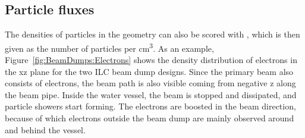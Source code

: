 \subsection{Particle fluxes}
\label{BeamDumps:sim_surrounding:Particle}  
 The densities of particles in the geometry can also be scored with \fluka, which is then given as the number of particles per \si{\centi\meter\cubed}.
 As an example, Figure~\ref{fig:BeamDumps:Electrons} shows the density distribution of electrons in the xz plane for the two ILC beam dump designs.
 Since the primary beam also consists of electrons, the beam path is also visible coming from negative z along the beam pipe.
 Inside the water vessel, the beam is stopped and dissipated, and particle showers start forming. The electrons are boosted in the beam direction, because of which electrons outside the beam dump are mainly observed around and behind the vessel.  
